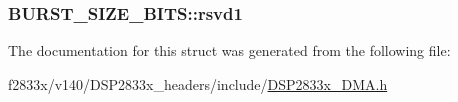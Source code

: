 \subsubsection[{rsvd1}]{ B\+U\+R\+S\+T\+\_\+\+S\+I\+Z\+E\+\_\+\+B\+I\+T\+S\+::rsvd1}\label{struct_b_u_r_s_t___s_i_z_e___b_i_t_s_aa246f403843691d354eb6839f5e12dbc}


The documentation for this struct was generated from the following file\+:\begin{DoxyCompactItemize}
\item 
f2833x/v140/\+D\+S\+P2833x\+\_\+headers/include/\hyperlink{_d_s_p2833x___d_m_a_8h}{D\+S\+P2833x\+\_\+\+D\+M\+A.\+h}\end{DoxyCompactItemize}
